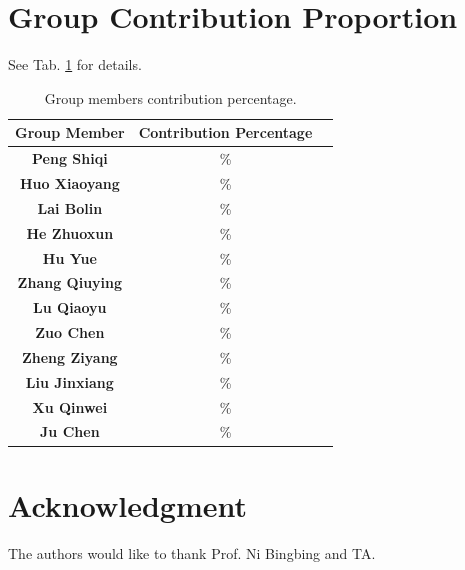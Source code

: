 \documentclass[journal]{IEEEtran}
\begin{document}
\appendices
\section{Group Contribution Proportion}

See Tab. \ref{tab_contri} for details.

\begin{table}[!htbp]
\centering
\caption{Group members contribution percentage.}
\label{tab_contri}
\begin{tabular}{ccc}
\toprule
\textbf{Group Member} & \textbf{Contribution Percentage} \\
\midrule
\textbf{Peng Shiqi}     & \% \\
\textbf{Huo Xiaoyang}   & \% \\
\textbf{Lai Bolin}      & \% \\
\textbf{He Zhuoxun}     & \% \\
\textbf{Hu Yue}         & \% \\
\textbf{Zhang Qiuying}  & \% \\
\textbf{Lu Qiaoyu}      & \% \\
\textbf{Zuo Chen}       & \% \\
\textbf{Zheng Ziyang}   & \% \\
\textbf{Liu Jinxiang}   & \% \\
\textbf{Xu Qinwei}      & \% \\
\textbf{Ju Chen}        & \% \\
\bottomrule
\end{tabular}
\end{table}

\section*{Acknowledgment}

The authors would like to thank Prof. Ni Bingbing and TA.


\ifCLASSOPTIONcaptionsoff
  \newpage
\fi



\end{document}
